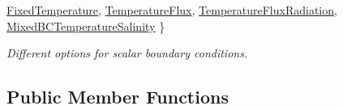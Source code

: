 \begin{DoxyCompactItemize}
\hyperlink{class_phys_b_c_util_a1beb9821cf9e783e3742b82b7070c97aa8753c4fd6fcfae4d3af72ecf1ceb6afb}{Fixed\+Temperature}, 
\hyperlink{class_phys_b_c_util_a1beb9821cf9e783e3742b82b7070c97aaedb5400f6f9f4fca5b2e76554b46ad00}{Temperature\+Flux}, 
\newline
\hyperlink{class_phys_b_c_util_a1beb9821cf9e783e3742b82b7070c97aa7f2dc59ed32fa174db287db133d4bf90}{Temperature\+Flux\+Radiation}, 
\hyperlink{class_phys_b_c_util_a1beb9821cf9e783e3742b82b7070c97aa55808703af58fdb3753923ee6a5ecd0d}{Mixed\+B\+C\+Temperature\+Salinity}
 \}\begin{DoxyCompactList}\small\item\em Different options for scalar boundary conditions. \end{DoxyCompactList}
\end{DoxyCompactItemize}
\subsection*{Public Member Functions}
